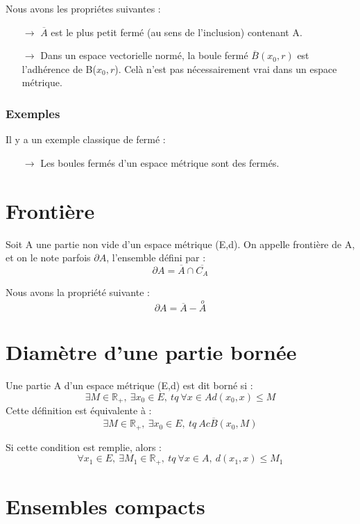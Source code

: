 \begin{prop}
Nous avons les propriétes suivantes :
\begin{itemize}
 \item[$\rightarrow$] $\overline{A}$ est le plus petit fermé (au sens de l'inclusion) contenant A.
 \item[$\rightarrow$] Dans un espace vectorielle normé, la boule fermé $\overline{B}(x_0,r)$ est l'adhérence de B($x_0,r$). Celà n'est pas nécessairement vrai dans un espace métrique.
\end{itemize}
\end{prop}
\subsubsection{Exemples}
Il y a un exemple classique de fermé : 
\begin{itemize}
 \item[$\rightarrow$] Les boules fermés d'un espace métrique sont des fermés.
\end{itemize}
\section{Frontière}
\begin{de}
Soit A une partie non vide d'un espace métrique (E,d). On appelle frontière de A, et on le note parfois $\partial A$, l'ensemble défini par : 
$$\partial A = \overline{A} \cap \overline{C_A}$$
\end{de}
\begin{prop}
Nous avons la propriété suivante :
$$\partial A = \overline{A} - \overset{o}A$$
\end{prop}
\section{Diamètre d'une partie bornée}
\begin{de}
Une partie A d'un espace métrique (E,d) est dit borné si : 
$$\exists M \in \mathbb{R}_+,~\exists x_0 \in E,~tq~ \forall x \in A d(x_0,x) \leq M$$
Cette définition est équivalente à : 
$$\exists M \in \mathbb{R}_+,~\exists x_0 \in E,~tq~ A c \overline{B}(x_0,M)$$
\end{de}
\begin{prop}
Si cette condition est remplie, alors : 
$$\forall x_1 \in E,~ \exists M_1 \in \mathbb{R}_+,~ tq~\forall x \in A,~ d(x_1,x) \leq M_1$$
\end{prop}
\section{Ensembles compacts}
